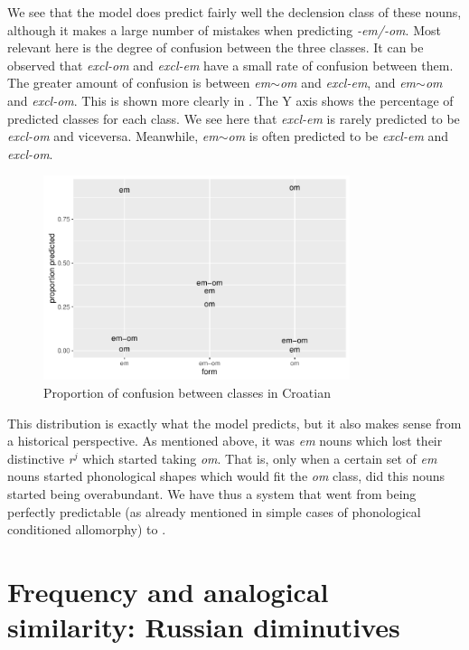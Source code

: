 We see that the model does predict fairly well the declension class of these nouns, although it makes a large number of mistakes when predicting \textit{-em/-om}. Most relevant here is the degree of confusion between the three classes. It can be observed that \textit{excl-om} and \textit{excl-em} have a small rate of confusion between them. The greater amount of confusion is between \textit{em}$\sim$\textit{om} and \textit{excl-em}, and \textit{em}$\sim$\textit{om} and \textit{excl-om}. This is shown more clearly in . The Y axis shows the percentage of predicted classes for each class. We see here that  \textit{excl-em} is rarely predicted to be  \textit{excl-om} and viceversa. Meanwhile, \textit{em}$\sim$\textit{om} is often predicted to be \textit{excl-em} and \textit{excl-om}.

\begin{figure}
  \centering
  \includegraphics[width=0.8\textwidth]{./figures/croatian/croatian.pdf}
  \caption{Proportion of confusion between classes in Croatian}\label{fig:croatian-results}
\end{figure}

\largerpage[2]
This distribution is exactly what the model predicts, but it also makes sense from a historical perspective. As mentioned above, it was \textit{em} nouns which lost their distinctive \textit{r}$^j$ which started taking \textit{om}. That is, only when a certain set of \textit{em} nouns started phonological shapes which would fit the \textit{om} class, did this nouns started being overabundant. We have thus a system that went from being perfectly predictable (as already mentioned in simple cases of phonological conditioned allomorphy) to .

\section{Frequency and analogical similarity: Russian diminutives}

